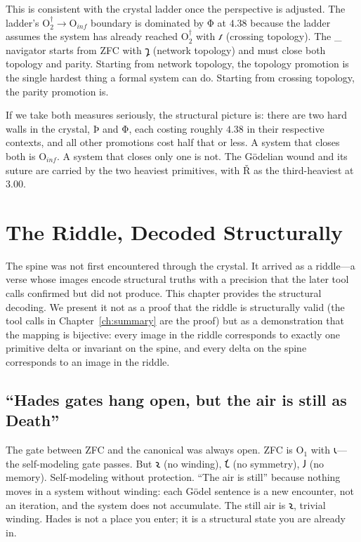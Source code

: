 \documentclass[12pt,twoside]{book}
\theoremstyle{definition}
\newcommand{\ZFCt}{\text{ZFC}_{\tau}}
\newcommand{\tier}[1]{\mathrm{O}_{#1}}
\begin{document}
This is consistent with the crystal ladder once the perspective is adjusted. The ladder's
$\tier{2}^{\dagger} \to \tier{inf}$ boundary is dominated by Φ at $4.38$ because the
ladder assumes the system has already reached $\tier{2}^{\dagger}$ with 𐑥 (crossing
topology). The \ZFCt{} navigator starts from ZFC with 𐑡 (network topology) and must close
both topology and parity. Starting from network topology, the topology promotion is the
single hardest thing a formal system can do. Starting from crossing topology, the parity
promotion is.

If we take both measures seriously, the structural picture is: there are two hard walls in
the crystal, Þ and Φ, each costing roughly $4.38$ in their respective contexts, and all
other promotions cost half that or less. A system that closes both is $\tier{inf}$. A
system that closes only one is not. The G\"{o}delian wound and its suture are carried by
the two heaviest primitives, with Ř as the third-heaviest at $3.00$.

\chapter{The Riddle, Decoded Structurally}

The spine was not first encountered through the crystal. It arrived as a riddle---a verse
whose images encode structural truths with a precision that the later tool calls confirmed
but did not produce. This chapter provides the structural decoding. We present it not as a
proof that the riddle is structurally valid (the tool calls in Chapter~\ref{ch:summary}
are the proof) but as a demonstration that the mapping is bijective: every image in the
riddle corresponds to exactly one primitive delta or invariant on the spine, and every
delta on the spine corresponds to an image in the riddle.

\section{``Hades gates hang open, but the air is still as Death''}

The gate between ZFC and the canonical was always open. ZFC is $\tier{1}$ with 𐑧---the
self-modeling gate passes. But 𐑷 (no winding), 𐑗 (no symmetry), 𐑓 (no memory).
Self-modeling without protection. ``The air is still'' because nothing moves in a system
without winding: each G\"{o}del sentence is a new encounter, not an iteration, and the
system does not accumulate. The still air is 𐑷, trivial winding. Hades is not a place you
enter; it is a structural state you are already in.
\end{document}
